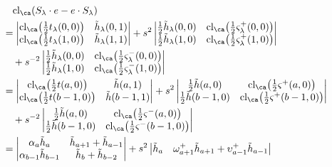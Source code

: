 \begin{align*}
&\quad \textrm{cl}_\ca ( S_\lambda \cdot e - e \cdot S_\lambda ) \\
&=
\begin{vmatrix}
\cl_\ca \big( \frac{1}{2} t_\lambda(0,0) \big) & \tilde{h}_\lambda(0,1) \\
\cl_\ca \big( \frac{1}{2} t_\lambda(1,0) \big) & \tilde{h}_\lambda(1,1)
\end{vmatrix}
+ s^2
\begin{vmatrix}
\frac{1}{2}\tilde{h}_\lambda(0,0) & \cl_\ca \big( \frac{1}{2} \varsigma_\lambda^+(0,0) \big) \\
\frac{1}{2}\tilde{h}_\lambda(1,0) & \cl_\ca \big( \frac{1}{2} \varsigma_\lambda^+(1,0) \big)
\end{vmatrix} \\
& \quad + s^{-2}
\begin{vmatrix}
\frac{1}{2}\tilde{h}_\lambda(0,0) & \cl_\ca \big( \frac{1}{2} \varsigma_\lambda^-(0,0) \big) \\
\frac{1}{2}\tilde{h}_\lambda(1,0) & \cl_\ca \big( \frac{1}{2} \varsigma_\lambda^-(1,0) \big)
\end{vmatrix} \\
&=
\begin{vmatrix}
\cl_\ca \big( \frac{1}{2} t(a,0) \big) & \tilde{h}(a,1) \\
\cl_\ca \big( \frac{1}{2} t(b-1,0) \big) & \tilde{h}(b-1,1)
\end{vmatrix}
+ s^2
\begin{vmatrix}
\frac{1}{2}\tilde{h}(a,0) & \cl_\ca \big( \frac{1}{2} \varsigma^+(a,0) \big) \\
\frac{1}{2}\tilde{h}(b-1,0) & \cl_\ca \big( \frac{1}{2} \varsigma^+(b-1,0) \big)
\end{vmatrix} \\
& \quad + s^{-2}
\begin{vmatrix}
\frac{1}{2}\tilde{h}(a,0) & \cl_\ca \big( \frac{1}{2} \varsigma^-(a,0) \big) \\
\frac{1}{2}\tilde{h}(b-1,0) & \cl_\ca \big( \frac{1}{2} \varsigma^-(b-1,0) \big)
\end{vmatrix} \\
&=
\begin{vmatrix}
\alpha_a \tilde{h}_a & \tilde{h}_{a+1} + \tilde{h}_{a-1} \\
\alpha_{b-1} \tilde{h}_{b-1} & \tilde{h}_{b} + \tilde{h}_{b-2}
\end{vmatrix}
+ s^2
\begin{vmatrix}
\tilde{h}_a & \omega_{a+1}^+ \tilde{h}_{a+1} + \upsilon^+_{a-1} \tilde{h}_{a-1} \\

\end{vmatrix}
\end{align*}
